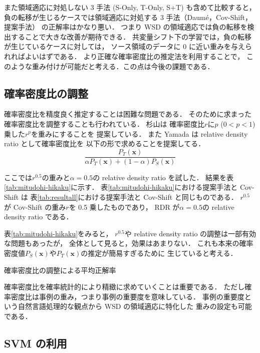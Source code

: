 \documentclass[japanese]{jnlp_1.4}
\begin{document}
また領域適応に対処しない 3 手法 (S-Only, T-Only, S+T)
も含めて比較すると，負の転移が生じるケースでは領域適応に対処する 3 手法（Daum{\'e}，Cov-Shift，提案手法）
の正解率はかなり悪い．
つまり WSD の領域適応では負の転移を検出することで大きな改善が期待できる．
共変量シフト下の学習では，負の転移が生じているケースに対しては，
ソース領域のデータに 0 に近い重みを与えられればよいはずである．
より正確な確率密度比の推定法を利用することで，
このような重み付けが可能だと考える．この点は今後の課題である．


\subsection{確率密度比の調整}

確率密度比を精度良く推定することは困難な問題である．
そのために求まった確率密度比を調整することも行われている．
杉山は
確率密度比\( r \)に\( p \) (\(0 < p < 1\)) 乗した\( r^p \)を重みにすることを
提案している\cite{sugiyama-2006-09-05}．
また Yamada は relative density ratio として確率密度比を
以下の形で求めることを提案してる\cite{yamada2011relative}．
\[
\frac{P_T(\boldsymbol{x})}{\alpha P_T(\boldsymbol{x}) + (1-\alpha)P_S(\boldsymbol{x})}
\]

ここでは\( r^{0.5} \)の重みと\( \alpha = 0.5 \)の relative density ratio を試した．
結果を\mbox{表\ref{tab:mitudohi-hikaku}}に示す．
\mbox{表\ref{tab:mitudohi-hikaku}}における提案手法と Cov-Shift は
\mbox{表\ref{tab:resultall}}における提案手法と Cov-Shift と同じものである．
\( r^{0.5}\)が \mbox{Cov-Shift} の重み\( r \)を 0.5 乗したものであり，
RDR が\( \alpha = 0.5 \)の relative density ratio である．

\mbox{表\ref{tab:mitudohi-hikaku}}をみると，
\( r^{0.5}\)や relative density ratio の調整は一部有効な問題もあったが，
全体として見ると，効果はあまりない．
これも本来の確率密度値\( P_S(\boldsymbol{x}) \)や\( P_T(\boldsymbol{x}) \)の推定が簡易すぎるために
生じていると考える．

\begin{table}[b]
\caption{確率密度比の調整による平均正解率}
\label{tab:mitudohi-hikaku}

\end{table}

確率密度比を確率統計的により精緻に求めていくことは重要である．
ただし確率密度比は事例の重み，つまり事例の重要度を意味している．
事例の重要度という自然言語処理的な観点から WSD の領域適応に特化した
重みの設定も可能である．


\subsection{ SVM の利用}
\end{document}
